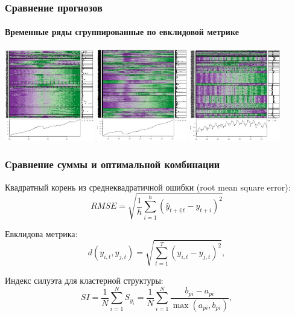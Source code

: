 \documentclass[c, dvipsnames]{beamer}  %
\begin{document}
\begin{frame}[shrink=5]
\frametitle{Сравнение прогнозов} 
\framesubtitle{Временные ряды сгруппированные по евклидовой метрике}

\vfil
\hfil\hfil\includegraphics[height=4cm]{screenshot068}\hfil\hfil
\includegraphics[height=4cm]{screenshot069}\hfil\hfil
\includegraphics[height=4cm]{screenshot070}
\newline
\null\hfil\hfil{}
\hfil\hfil{}
\hfil\hfil{}
\end{frame}


\begin{frame}[shrink=5]
\frametitle{Сравнение суммы и оптимальной комбинации } 


Квадратный корень из среднеквадратичной ошибки (root mean square error):
\begin{equation}\label{key}
RMSE = \sqrt{  \frac{1}{h} \sum_{i=1}^h(\hat{y}_{t+i|t}-y_{t+i})^2}
\end{equation}


Евклидова метрика:
\begin{equation}\label{key}
d(y_{i,t},y_{j,t}) = \sqrt{\sum^T_{t=1} (y_{i,t} - y_{j,t}  )^2 }, 
\end{equation}

Индекс силуэта для кластерной структуры: 
\begin{equation}\label{key}
SI = \frac{1}{N} \sum^N_{i=1} S_{y_i}=\frac{1}{N} \sum^N_{i=1} \dfrac{b_{pi}-a_{pi}}{\max(a_{pi}, b_{pi})},
\end{equation}

\end{frame}
\end{document}
